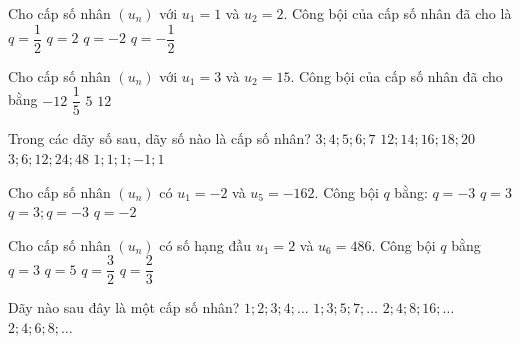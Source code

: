 \begin{ex}%
	Cho cấp số nhân $(u_n)$ với $u_1=1$ và $u_2=2$.  Công bội của cấp số nhân đã cho là
	 \choice
		{$q=\dfrac{1}{2}$} 
		{\True  $q=2$}
		{$q=-2$} 
		{$q=-\dfrac{1}{2}$} 
\end{ex}

\begin{ex}%
	Cho cấp số nhân $(u_n)$ với $u_1=3$ và $u_2=15$. Công bội của cấp số nhân đã  cho bằng
	\choice 
		 {$-12$}
		 {$\dfrac{1}{5}$}
		{\True  $5$}
		{$12$} 
\end{ex}

\begin{ex}%
	Trong các dãy số sau, dãy  số nào là cấp số nhân?
	\choice 
		{$3; 4;  5; 6; 7$}
		{$12; 14; 16; 18;  20$}
		{\True $3; 6; 12; 24;  48$}
		{$1;  1; 1; -1; 1$}
\end{ex}

\begin{ex}%
	Cho cấp số nhân $\left(u_n\right)$ có $u_1=-2$  và $u_5=-162$. Công bội $q$ bằng:
	\choice 
		{$q=-3$} 
		 {$q=3$}
		{\True $q=3;q=-3$} 
		 {$q=-2$}
\end{ex}

\begin{ex}%
	Cho cấp số nhân  $(u_n)$ có số hạng đầu $u_1=2$ và $u_6=486$. Công bội $q$ bằng
	 \choice
		{\True $q=3$} 
		 {$q=5$}
		{$q=\dfrac{3}{2}$} 
		{$q=\dfrac{2}{3}$} 
\end{ex}

\begin{ex}%
	Dãy nào sau đây là một cấp số  nhân?
	\choice 
		{$1; 2; 3;  4; \ldots$}
		{$1; 3;  5; 7; \ldots$}
		{\True $2;  4; 8; 16; \ldots$}
		{$2; 4; 6;  8; \ldots$}
\end{ex}

